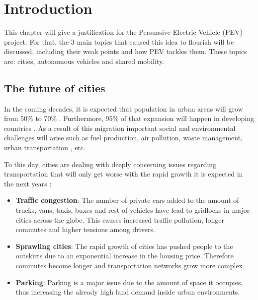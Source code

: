 
\chapter{Introduction}
\label{ch:intro}

This chapter will give a justification for the Persuasive Electric Vehicle (PEV) project. For that, the 3 main topics that caused this idea to flourish will be discussed, including their weak points and how PEV tackles them. These topics are: cities, autonomous vehicles and shared mobility. 

\section{The future of cities}

In the coming decades, it is expected that population in urban areas will grow from 50\% to 70\% . Furthermore, 95\% of that expansion will happen in developing countries . As a result of this migration important social and environmental challenges will arise such as fuel production, air pollution, waste management, urban transportation , etc.

To this day, cities are dealing with deeply concerning issues regarding transportation that will only get worse with the rapid growth it is expected in the next years :

\begin{itemize}

  \item \textbf{Traffic congestion}: The number of private cars added to the amount of trucks, vans, taxis, buxes and rest of vehicles have lead to gridlocks in major cities across the globe. This causes increased traffic pollution, longer commutes and higher tensions among drivers.

  \item \textbf{Sprawling cities}: The rapid growth of cities has pushed people to the outskirts due to an exponential increase in the housing price. Therefore commutes become longer and transportation networks grow more complex.

  \item \textbf{Parking}: Parking is a major issue due to the amount of space it occupies, thus increasing the already high land demand inside urban environments.

\end{itemize}  

